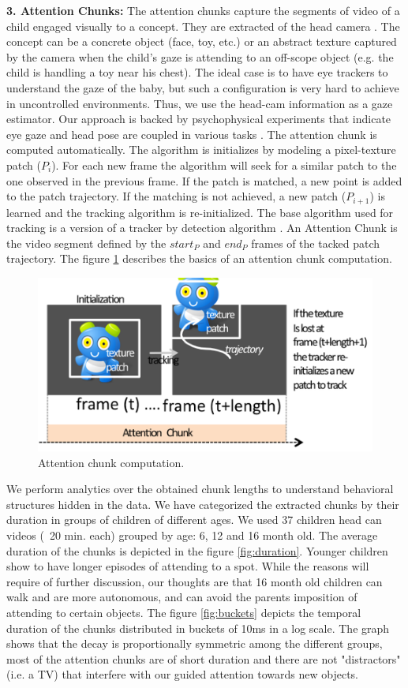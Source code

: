 \documentclass[10pt,letterpaper]{article}
\begin{document}
{\bf 3. Attention Chunks:} 
The attention chunks capture the segments of video of a child engaged visually to a concept. They are extracted of the head camera
. The concept can be a concrete object (face, toy, etc.) or an abstract texture captured by the camera when the child's gaze is attending to an off-scope object (e.g. the child is handling a toy near his chest). The ideal case is to have eye trackers to understand the gaze of the baby, but such a configuration is very hard to achieve in uncontrolled environments. Thus, we use the head-cam information as a gaze estimator. Our approach is backed by psychophysical experiments that indicate eye gaze and head pose are coupled in various tasks \cite{Land1,Pelz}. The attention chunk is computed automatically. The algorithm is initializes by modeling a pixel-texture patch ($P_{i}$). 
For each new frame the algorithm will seek for a similar patch to the one observed in the previous frame. If the patch is matched, a new point is added to the patch trajectory. If the matching is not achieved, a new patch ($P_{i+1}$) is learned and the tracking algorithm is re-initialized. The base algorithm used for tracking is a version of a tracker by detection algorithm \cite{kalal}. An Attention Chunk is the video segment defined by the $start_{P}$ and $end_{P}$ frames of the tacked patch trajectory.
The figure \ref{fig:chunk} describes the basics of an attention chunk computation.\\
\begin{figure}[h]
\begin{center}
        \includegraphics[width=0.5\linewidth]{Image/Attchunk}      
          \end{center}
    \caption{Attention chunk computation.}
   \label{fig:chunk}
\end{figure}
We perform analytics over the obtained chunk lengths to understand behavioral structures hidden in the data. We have categorized the extracted chunks by their duration in groups of children of different ages. We used 37 children head can videos (~20 min. each) grouped by age: 6, 12 and 16 month old. The average duration of the chunks is depicted in the figure \ref{fig:duration}. Younger children show to have longer episodes of attending to a spot. While the reasons will require of further discussion, our thoughts are that 16 month old children can walk and are more autonomous, and can avoid the parents imposition of attending to certain objects. The figure \ref{fig:buckets} depicts the temporal duration of the chunks distributed in buckets of 10ms in a log scale. The graph shows that the decay is proportionally symmetric among the different groups, most of the attention chunks are of short duration and there are not "distractors" (i.e. a TV) that interfere with our guided attention towards new objects. 
\end{document}
